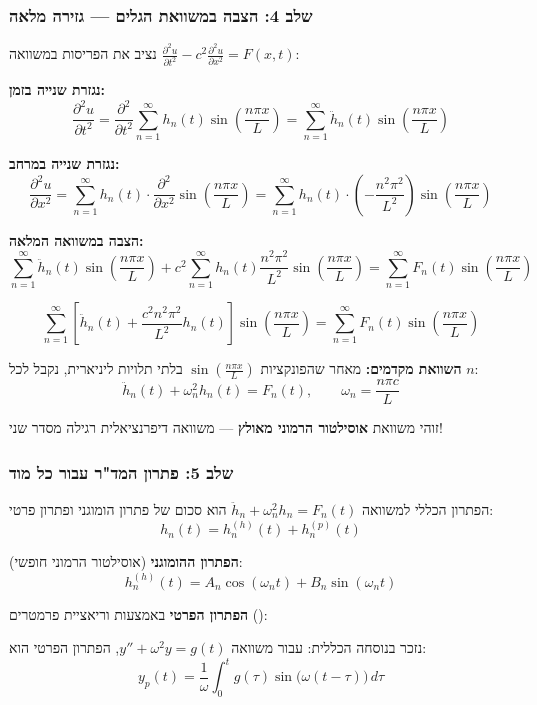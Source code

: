 \subsubsection{שלב 4: הצבה במשוואת הגלים — גזירה מלאה}
נציב את הפריסות במשוואה $\frac{\partial^2 u}{\partial t^2}-c^2\frac{\partial^2 u}{\partial x^2}=F(x,t)$:

\textbf{נגזרת שנייה בזמן:}
\[
\frac{\partial^2 u}{\partial t^2} = \frac{\partial^2}{\partial t^2}\sum_{n=1}^\infty h_n(t)\sin\!\left(\frac{n\pi x}{L}\right) = \sum_{n=1}^\infty \ddot{h}_n(t)\sin\!\left(\frac{n\pi x}{L}\right)
\]

\textbf{נגזרת שנייה במרחב:}
\[
\frac{\partial^2 u}{\partial x^2} = \sum_{n=1}^\infty h_n(t) \cdot \frac{\partial^2}{\partial x^2}\sin\!\left(\frac{n\pi x}{L}\right) = \sum_{n=1}^\infty h_n(t) \cdot \left(-\frac{n^2\pi^2}{L^2}\right)\sin\!\left(\frac{n\pi x}{L}\right)
\]

\textbf{הצבה במשוואה המלאה:}
\[
\sum_{n=1}^\infty \ddot{h}_n(t)\sin\!\left(\frac{n\pi x}{L}\right) + c^2\sum_{n=1}^\infty h_n(t)\frac{n^2\pi^2}{L^2}\sin\!\left(\frac{n\pi x}{L}\right) = \sum_{n=1}^\infty F_n(t)\sin\!\left(\frac{n\pi x}{L}\right)
\]

\[
\sum_{n=1}^\infty \left[\ddot{h}_n(t) + \frac{c^2 n^2\pi^2}{L^2}h_n(t)\right]\sin\!\left(\frac{n\pi x}{L}\right) = \sum_{n=1}^\infty F_n(t)\sin\!\left(\frac{n\pi x}{L}\right)
\]

\textbf{השוואת מקדמים:} מאחר שהפונקציות $\sin\left(\frac{n\pi x}{L}\right)$ בלתי תלויות ליניארית, נקבל לכל $n$:
\[
\boxed{\ddot{h}_n(t) + \omega_n^2 h_n(t) = F_n(t), \qquad \omega_n = \frac{n\pi c}{L}}
\]

זוהי משוואת \textbf{אוסילטור הרמוני מאולץ} — משוואה דיפרנציאלית רגילה מסדר שני!

\subsubsection{שלב 5: פתרון המד"ר עבור כל מוד}
הפתרון הכללי למשוואה $\ddot{h}_n + \omega_n^2 h_n = F_n(t)$ הוא סכום של פתרון הומוגני ופתרון פרטי:
\[
h_n(t)=h_n^{(h)}(t)+h_n^{(p)}(t)
\]

\textbf{הפתרון ההומוגני} (אוסילטור הרמוני חופשי):
\[
h_n^{(h)}(t)=A_n\cos(\omega_n t)+B_n\sin(\omega_n t)
\]

\textbf{הפתרון הפרטי} באמצעות וריאציית פרמטרים ():

נזכר בנוסחה הכללית: עבור משוואה $y'' + \omega^2 y = g(t)$, הפתרון הפרטי הוא:
\[
y_p(t) = \frac{1}{\omega}\int_0^t g(\tau)\sin\bigl(\omega(t-\tau)\bigr)\,d\tau
\]

